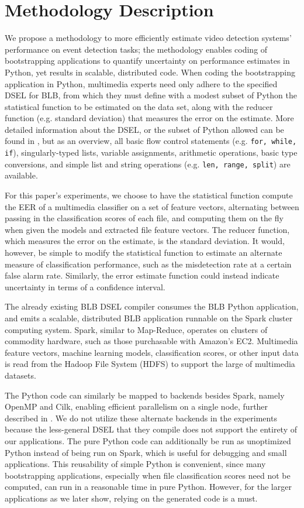 \section{Methodology Description}

We propose a methodology to more efficiently estimate video detection systems' performance on event detection tasks; the methodology enables coding of bootstrapping applications to quantify uncertainty on performance estimates in Python, yet results in scalable, distributed code. 
When coding the bootstrapping application in Python, multimedia experts
need only adhere to the specified DSEL for BLB, from which they must define with a modest subset of Python the statistical function to be estimated on the data set, along with the reducer function (e.g. standard deviation) that measures the error on the estimate.
More detailed information about the DSEL, or the subset of Python allowed can be found in \cite{pbirsinger2013}, but as an overview, all basic flow control statements (e.g. \texttt{for, while, if}), singularly-typed lists, variable assignments, arithmetic operations, basic type conversions, and simple list and string operations (e.g. \texttt{len, range, split}) are available. 

For this paper's experiments, we choose to have the statistical function compute the EER of a multimedia classifier on a set of feature vectors, alternating between passing in the classification scores of each file, and computing them on the fly when given the models and extracted file feature vectors. 
The reducer function, which measures the error on the estimate, is the standard deviation. 
It would, however, be simple to modify the statistical function to estimate an alternate measure of classification performance, such as the misdetection rate at a certain false alarm rate. 
Similarly, the error estimate function could instead indicate uncertainty in terms of a confidence interval.  

The already existing BLB DSEL compiler consumes the BLB Python application, and emits
a scalable, distributed BLB application runnable on the Spark cluster computing system. 
Spark, similar to Map-Reduce, operates on clusters of commodity hardware, such as those purchasable with
Amazon's EC2. Multimedia feature vectors, machine learning models, classification scores, or other input
data is read from the Hadoop File System (HDFS) to support the large of multimedia datasets. 

The Python code can similarly be mapped to backends besides Spark, namely OpenMP and Cilk, enabling efficient parallelism on a single node, further described in \cite{pbirsinger2013}. We do not utilize these alternate backends in the experiments because the less-general DSEL that they compile does not support the entirety of our applications.  
The pure Python code can additionally be run as unoptimized Python instead of being run on Spark, which is useful for debugging and small applications. 
This reusability of simple Python is convenient, since many bootstrapping applications, especially when file classification scores need not be computed, can run in a reasonable time in pure Python. However, for the larger applications as we later show, relying on the generated code is a must.

